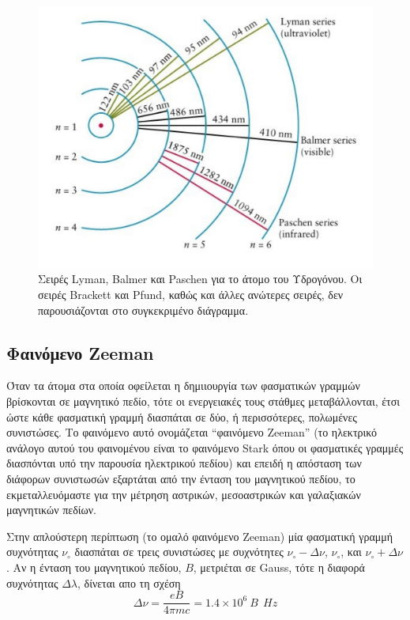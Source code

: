 \begin{figure}[h]
    \centering
    \includegraphics[scale=0.5]{Figures/hydrogen_spectral_lines.png}
    \caption{Σειρές Lyman, Balmer και Paschen για το άτομο του Υδρογόνου. Οι σειρές Brackett και Pfund, καθώς και άλλες ανώτερες σειρές, δεν παρουσιάζονται στο συγκεκριμένο διάγραμμα.}
    \label{fig:hydrogen_lines}
\end{figure}



\subsection{Φαινόμενο Zeeman}
Όταν τα άτομα στα οποία οφείλεται η δημιιουργία των φασματικών γραμμών βρίσκονται σε μαγνητικό πεδίο, τότε οι ενεργειακές τους στάθμες μεταβάλλονται, έτσι ώστε κάθε φασματική γραμμή διασπάται σε δύο, ή περισσότερες, πολωμένες συνιστώσες. Το φαινόμενο αυτό ονομάζεται ``φαινόμενο Zeeman'' (το ηλεκτρικό ανάλογο αυτού του φαινομένου είναι το φαινόμενο Stark όπου οι φασματικές γραμμές διασπόνται υπό την παρουσία ηλεκτρικού πεδίου) και επειδή η απόσταση των διάφορων συνιστωσών εξαρτάται από την ένταση του μαγνητικού πεδίου, το εκμεταλλευόμαστε για την μέτρηση αστρικών, μεσοαστρικών και γαλαξιακών μαγνητικών πεδίων. 

Στην απλούστερη περίπτωση (το ομαλό φαινόμενο Zeeman) μία φασματική γραμμή συχνότητας $\nu_{\circ}$ διασπάται σε τρεις συνιστώσες με συχνότητες $\nu_{\circ} - \Delta \nu$, $\nu_{\circ}$, και $\nu_{\circ} + \Delta \nu$. Αν η ένταση του μαγνητικού πεδίου, $B$, μετριέται σε Gauss, τότε η διαφορά συχνότητας $\Delta \lambda$, δίνεται απο τη σχέση 
\begin{equation}
    \Delta \nu =  \frac{eB}{4\pi m c} = 1.4 \times 10^6 \ B \ \ Hz
\end{equation}


